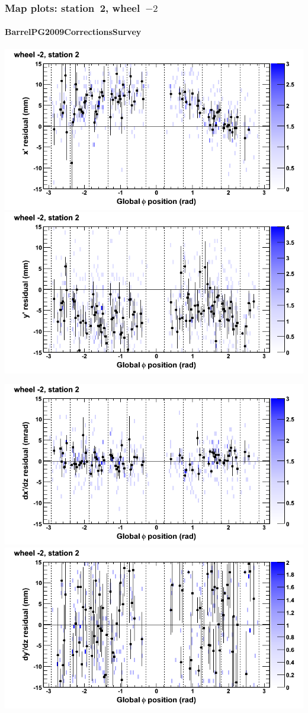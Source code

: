 \documentclass[compress]{beamer}
\begin{document}
\begin{frame}
\frametitle{Map plots: station~2, wheel~$-2$}
\framesubtitle{BarrelPG2009CorrectionsSurvey}
\includegraphics[width=0.5\linewidth]{mapplots_01/DTvsphi_st2whA_x.png}
\includegraphics[width=0.5\linewidth]{mapplots_01/DTvsphi_st2whA_y.png}

\includegraphics[width=0.5\linewidth]{mapplots_01/DTvsphi_st2whA_dxdz.png}
\includegraphics[width=0.5\linewidth]{mapplots_01/DTvsphi_st2whA_dydz.png}
\end{frame}
\end{document}
